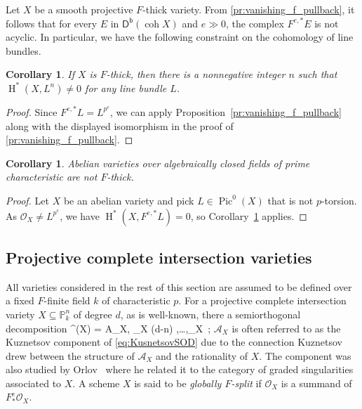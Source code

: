 \documentclass{amsart}
\let\oldequation\equation
\let\oldendequation\endequation
\renewenvironment{equation}{\linenomathNonumbers\oldequation}{\oldendequation\endlinenomath}
\newcommand{\coh}{\operatorname{coh}}
\newcommand{\dbcat}[1]{\cat{D}^{\mathsf{b}}(#1)}
\newcommand{\mco}{\mathcal{O}}
\newcommand{\cat}[1]{{\mathsf{#1}}}
\newcommand{\hh}{\operatorname{H}}
\newtheorem{corollary}[subsection]{Corollary}
\theoremstyle{definition}
\theoremstyle{remark}
\numberwithin{equation}{subsection}
\begin{document}
Let $X$ be a smooth projective $F$-thick variety. From \cref{pr:vanishing_f_pullback}, it follows that for every $E$ in  $\dbcat{\coh X}$ and $e \gg 0$, the complex $F^{e,*} E$ is not acyclic. In particular, we have the following constraint on the cohomology of line bundles.

\begin{corollary} \label{cor:neq-cohom-of-f-thick}
If $X$ is $F$-thick, then there is a nonnegative integer $n$ such that $\hh^*(X,L^n) \neq 0$ for any line bundle $L$.
\end{corollary}

\begin{proof}
Since $F^{e,*} L = L^{p^e}$, we can apply Proposition~\ref{pr:vanishing_f_pullback} along with the displayed isomorphism in the proof of \cref{pr:vanishing_f_pullback}.
\end{proof}

\begin{corollary}
Abelian varieties over algebraically closed fields of prime characteristic are not $F$-thick.
\end{corollary}

\begin{proof}
Let $X$ be an abelian variety and pick  $L \in \operatorname{Pic}^0(X)$ that is not $p$-torsion. As $\mco_X \neq L^{p^e}$, we have $\hh^*(X,F^{e,*}L) = 0$, so Corollary~\ref{cor:neq-cohom-of-f-thick} applies.
\end{proof}

\subsection*{Projective complete intersection varieties}
\label{sec:F_summands_CI}

All varieties considered in the rest of this section are assumed to be defined over a fixed $F$-finite field $k$ of characteristic $p$. For a projective complete intersection variety $X\subseteq \mathbb{P}_k^n$ of degree $d$, as is well-known, there a semiorthogonal decomposition
\begin{equation}
 \label{eq:KusnetsovSOD}
 \dbcat{\coh X} = \langle \mathcal A_X, \mco_X (d-n) ,\ldots,\mco_X \rangle\,;
\end{equation}
 $\mathcal A_X$ is often referred to as the Kuznetsov component of \cref{eq:KusnetsovSOD} due to the connection Kuznetsov~\cite{Kuznsetov:CubicFourFold} drew between the structure of $\mathcal A_X$ and the rationality of $X$. The component was also studied by Orlov~\cite[Theorem~2.3]{orlov_derivd_cats_sing} where he related it to the category of graded singularities associated to $X$. A scheme $X$ is said to be \emph{globally $F$-split} if $\mco_X$ is a summand of $F^e_*\mco_X$.
\end{document}
